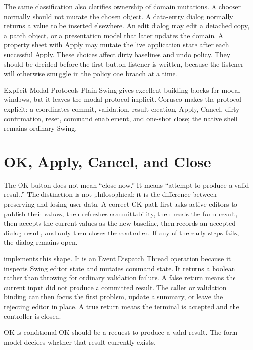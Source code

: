 The same classification also clarifies ownership of domain mutations. A chooser
normally should not mutate the chosen object. A data-entry dialog normally
returns a value to be inserted elsewhere. An edit dialog may edit a detached
copy, a patch object, or a presentation model that later updates the domain.
A property sheet with Apply may mutate the live application state after each
successful Apply. These choices affect dirty baselines and undo policy. They
should be decided before the first button listener is written, because the
listener will otherwise smuggle in the policy one branch at a time.

\begin{coruscobox}{Explicit Modal Protocols}
Plain Swing gives excellent building blocks for modal windows, but it leaves
the modal protocol implicit. Corusco makes the protocol explicit: a
 coordinates commit, validation, result creation, Apply,
Cancel, dirty confirmation, reset, command enablement, and one-shot close; the
native shell remains ordinary Swing.
\end{coruscobox}

\section{OK, Apply, Cancel, and Close}

The OK button does not mean ``close now.'' It means ``attempt to produce a
valid result.'' The distinction is not philosophical; it is the difference
between preserving and losing user data. A correct OK path first asks active
editors to publish their values, then refreshes committability, then reads the
form result, then accepts the current values as the new baseline, then records
an accepted dialog result, and only then closes the controller. If any of the
early steps fails, the dialog remains open.

 implements this shape. It is an Event Dispatch Thread
operation because it inspects Swing editor state and mutates command state. It
returns a boolean rather than throwing for ordinary validation failure. A false
return means the current input did not produce a committed result. The caller
or validation binding can then focus the first problem, update a summary, or
leave the rejecting editor in place. A true return means the terminal
 is accepted and the controller is closed.

\begin{principlebox}{OK is conditional}
OK should be a request to produce a valid result. The form model decides
whether that result currently exists.
\end{principlebox}

